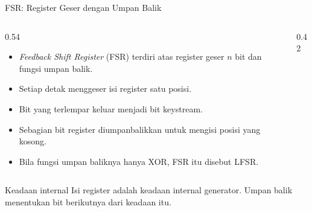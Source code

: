 \documentclass[aspectratio=169,11pt]{beamer}
\begin{document}
\begin{frame}{FSR: Register Geser dengan Umpan Balik}
    \footnotesize
    \begin{columns}[T,onlytextwidth]
        \begin{column}{0.54\textwidth}
            \begin{itemize}
                \item \textit{Feedback Shift Register} (FSR) terdiri atas
                      register geser $n$ bit dan fungsi umpan balik.
                \item Setiap detak menggeser isi register satu posisi.
                \item Bit yang terlempar keluar menjadi bit keystream.
                \item Sebagian bit register diumpanbalikkan untuk mengisi
                      posisi yang kosong.
                \item Bila fungsi umpan baliknya hanya XOR, FSR itu disebut
                      LFSR.
            \end{itemize}
        \end{column}
        \begin{column}{0.42\textwidth}
            \centering
        \end{column}
    \end{columns}
    \vspace{0.1cm}
    \begin{block}{Keadaan internal}
        Isi register adalah keadaan internal generator. Umpan balik
        menentukan bit berikutnya dari keadaan itu.
    \end{block}
\end{frame}
\end{document}
